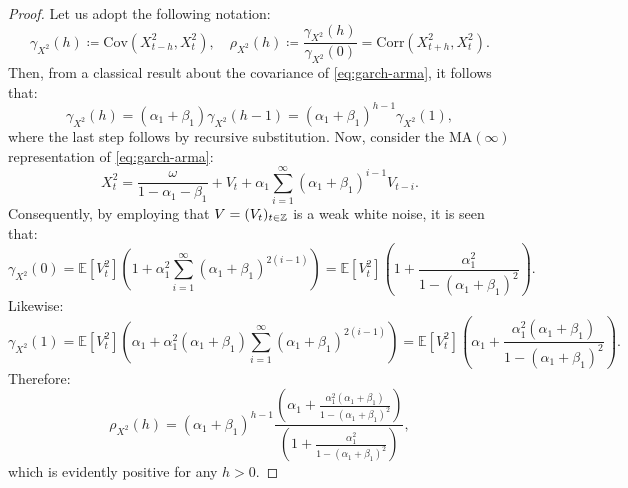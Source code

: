 \begin{proof}
Let us adopt the following notation:
\begin{equation*}
    \gamma_{X^{2}}(h)\coloneqq\mathrm{Cov}(X_{t-h}^{2},X_{t}^{2}),\quad\rho_{X^{2}}(h)\coloneqq\frac{\gamma_{X^{2}}(h)}{\gamma_{X^{2}}(0)}=\mathrm{Corr}(X_{t+h}^{2},X_{t}^{2}).
\end{equation*}
Then, from a classical result about the covariance of \eqref{eq:garch-arma}, it follows that:
\begin{equation*}
    \gamma_{X^{2}}(h)=(\alpha_{1}+\beta_{1})\gamma_{X^{2}}(h-1)=(\alpha_{1}+\beta_{1})^{h-1}\gamma_{X^{2}}(1),
\end{equation*}
where the last step follows by recursive substitution. Now, consider the $\mathrm{MA}(\infty)$ representation of \eqref{eq:garch-arma}:
\begin{equation*}
    X_{t}^{2}=\frac{\omega}{1-\alpha_{1}-\beta_{1}}+V_{t}+\alpha_{1}\sum_{i=1}^{\infty}(\alpha_{1}+\beta_{1})^{i-1}V_{t-i}.
\end{equation*}
Consequently, by employing that $V=(V_{t})_{t\in\mathbb{Z}}$ is a weak white noise, it is seen that:
\begin{equation*}
    \gamma_{X^{2}}(0)=\mathbb{E}[V_{t}^{2}]\left(1+\alpha_{1}^{2}\sum_{i=1}^{\infty}(\alpha_{1}+\beta_{1})^{2(i-1)}\right)=\mathbb{E}[V_{t}^{2}]\left(1+\frac{\alpha_{1}^{2}}{1-(\alpha_{1}+\beta_{1})^{2}}\right).
\end{equation*}
Likewise:
\begin{equation*}
    \gamma_{X^{2}}(1)=\mathbb{E}[V_{t}^{2}]\left(\alpha_{1}+\alpha_{1}^{2}(\alpha_{1}+\beta_{1})\sum_{i=1}^{\infty}(\alpha_{1}+\beta_{1})^{2(i-1)}\right)=\mathbb{E}[V_{t}^{2}]\left(\alpha_{1}+\frac{\alpha_{1}^{2}(\alpha_{1}+\beta_{1})}{1-(\alpha_{1}+\beta_{1})^{2}}\right).
\end{equation*}
Therefore:
\begin{equation*}
    \rho_{X^{2}}(h)=(\alpha_{1}+\beta_{1})^{h-1}\frac{\left(\alpha_{1}+\frac{\alpha_{1}^{2}(\alpha_{1}+\beta_{1})}{1-(\alpha_{1}+\beta_{1})^{2}}\right)}{\left(1+\frac{\alpha_{1}^{2}}{1-(\alpha_{1}+\beta_{1})^{2}}\right)},
\end{equation*}
which is evidently positive for any $h>0$.
\end{proof}

